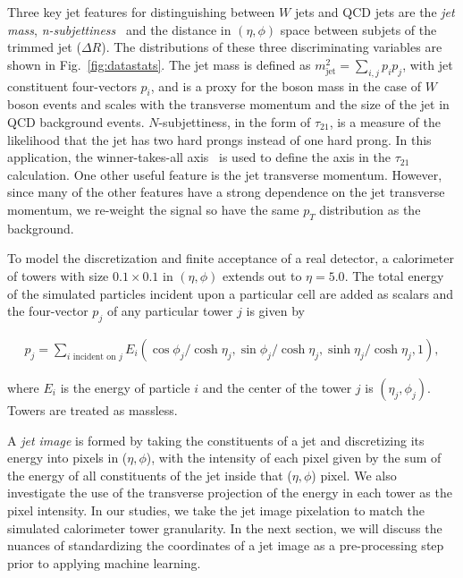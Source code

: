 Three key jet features for distinguishing between $W$ jets and QCD jets are the {\it jet mass}, {\it n-subjettiness}~\cite{nsub} and the distance in $(\eta,\phi)$ space between subjets of the trimmed jet ($\Delta R$).  The distributions of these three discriminating variables are shown in Fig.~\ref{fig:datastats}.   The jet mass is defined as $m_\text{jet}^2=\sum_{i,j} p_i p_j$, with jet constituent four-vectors $p_i$, and is a proxy for the boson mass in the case of $W$ boson events and scales with the transverse momentum and the size of the jet in QCD background events.  $N$-subjettiness, in the form of $\tau_{21}$, is a measure of the likelihood that the jet has two hard prongs instead of one hard prong.  In this application, the winner-takes-all axis~\cite{Larkoski:2014uqa} is used to define the axis in the $\tau_{21}$ calculation.  One other useful feature is the jet transverse momentum.  However, since many of the other features have a strong dependence on the jet transverse momentum, we re-weight the signal so have the same $p_T$ distribution as the background.

To model the discretization and finite acceptance of a real detector, a calorimeter of towers with size $0.1\times 0.1$ in $(\eta,\phi)$ extends out to $\eta=5.0$.  The total energy of the simulated particles incident upon a particular cell are added as scalars and the four-vector $p_j$ of any particular tower $j$ is given by

\begin{align}
\label{eq:calo}
p_j = \sum_{i\text{ incident on $j$}}E_i(\cos\phi_j/\cosh \eta_j,\sin\phi_j/\cosh \eta_j,\sinh \eta_j/\cosh \eta_j,1),
\end{align}

\noindent where $E_i$ is the energy of particle $i$ and the center of the tower $j$ is $(\eta_j,\phi_j)$.  Towers are treated as massless.

 A {\it jet image} is formed by taking the constituents of a jet and discretizing its energy into pixels in ($\eta,\phi$), with the intensity of each pixel given by the sum of the energy of all constituents of the jet inside that ($\eta,\phi$) pixel.  We also investigate the use of the transverse projection of the energy in each tower as the pixel intensity.  In our studies, we take the jet image pixelation to match the simulated calorimeter tower granularity.  In the next section, we will discuss the nuances of standardizing the coordinates of a jet image as a pre-processing step prior to applying machine learning.  


